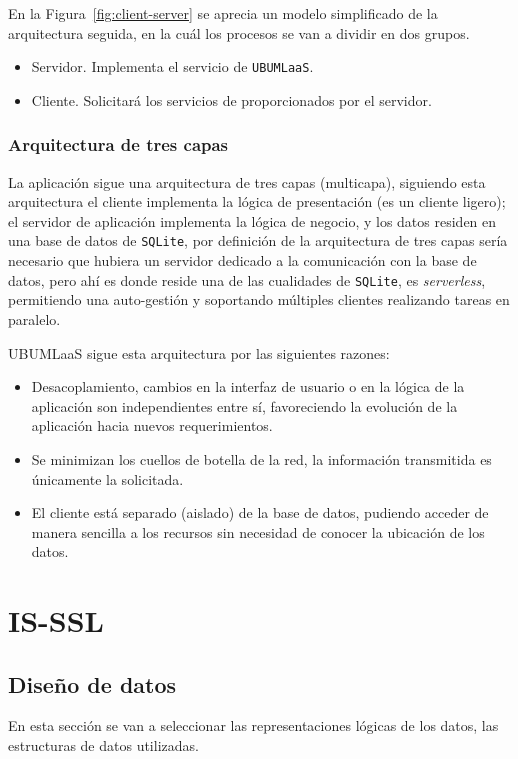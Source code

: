 En la Figura~\ref{fig:client-server} se aprecia un modelo simplificado de la arquitectura seguida, en la cuál los procesos se van a dividir en dos grupos. 
\begin{itemize}
\item Servidor. Implementa el servicio de \texttt{UBUMLaaS}.
\item Cliente. Solicitará los servicios de proporcionados por el servidor.
\end{itemize}

\subsubsection{Arquitectura de tres capas}
La aplicación sigue una arquitectura de tres capas (multicapa), siguiendo esta arquitectura el cliente implementa la lógica de presentación (es un cliente ligero); el servidor de aplicación implementa la lógica de negocio, y los datos residen en una base de datos de \texttt{SQLite}, por definición de la arquitectura de tres capas sería necesario que hubiera un servidor dedicado a la comunicación con la base de datos, pero ahí es donde reside una de las cualidades de \texttt{SQLite}, es \textit{serverless}, permitiendo una auto-gestión y soportando múltiples clientes realizando tareas en paralelo.

UBUMLaaS sigue esta arquitectura por las siguientes razones:
\begin{itemize}
\item Desacoplamiento, cambios en la interfaz de usuario o en la lógica de la aplicación son independientes entre sí, favoreciendo la evolución de la aplicación hacia nuevos requerimientos.
\item Se minimizan los cuellos de botella de la red, la información transmitida es únicamente la solicitada.
\item El cliente está separado (aislado) de la base de datos, pudiendo acceder de manera sencilla a los recursos sin necesidad de conocer la ubicación de los datos.
\end{itemize}

\FloatBarrier
\section{IS-SSL}
\subsection{Diseño de datos}
En esta sección se van a seleccionar las representaciones lógicas de los datos, las estructuras de datos utilizadas.

